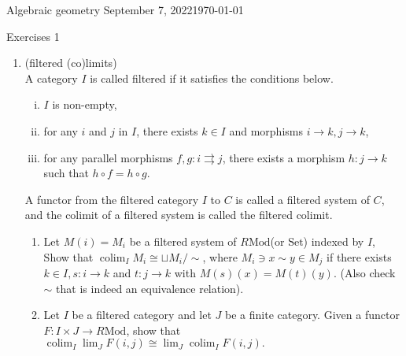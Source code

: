 \documentclass[a4paper,11pt]{article}
\def\mrm#1{\mathrm{#1}}
\def\Mod#1{#1\mathrm{Mod}}
\DeclareMathOperator{\colim}{colim}
\begin{document}
{\small Algebraic geometry \hfill September 7, 2022\today \\}
\begin{center}
\Huge Exercises 1
\end{center}

\vskip0.6cm
\begin{enumerate}[1.]
\item (filtered (co)limits) \\
A category $I$ is called filtered if it satisfies the conditions below.
\begin{enumerate}[(i)]
    \item  $I$ is non-empty,
    \item  for any $i$ and $j$ in $I$, there exists $k \in I$ and morphisms $i \to k, j \to k$,
    \item for any parallel morphisms $f,g: i \rightrightarrows  j$, there exists a morphism $h: j \to
    k$ such that $h \circ  f = h \circ g$.
\end{enumerate}
A functor from the filtered category $I$ to $C$ is called a filtered system of $C$, and the colimit of a filtered system is called the filtered colimit.
\begin{enumerate}
    \item Let $M(i)=M_i$ be a filtered system of $\Mod{R}$(or $\mrm{Set}$) indexed by $I$, Show that $\colim_I M_i\cong \sqcup M_i/ \sim$, where $M_i \ni x \sim y \in M_j$ if there exists $k \in I, s: i \to k$ and $ t: j \to k$
    with $ M(s)(x) = M(t)(y)$. (Also check $\sim$ that is indeed an equivalence relation).
    \item Let $I$ be a filtered category and let $J$ be a finite category. Given a functor $F: I\times J \to \Mod{R}$, show that $\colim_I\lim_J F(i,j)\cong\lim_J\colim_I F(i,j).$
\end{enumerate}


\end{enumerate}
\end{document}

